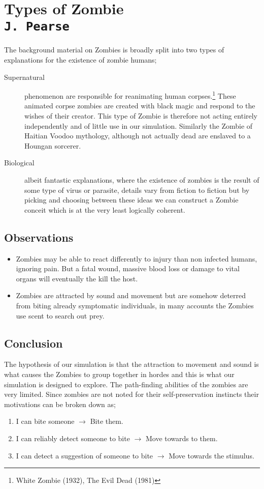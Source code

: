 \pagestyle{empty}

\section{Types of Zombie\\{\small\tt{J.~Pearse}}}
The background material on Zombies is broadly split into two types of explanations for the existence of zombie humans;
\begin{description}
\item[Supernatural] phenomenon are responsible for reanimating human corpses.\footnote{White Zombie (1932), The Evil Dead (1981)} These animated corpse zombies are created with black magic and respond to the wishes of their creator. This type of Zombie is therefore not acting entirely independently and of little use in our simulation. Similarly the Zombie of Haitian Voodoo mythology, although not actually dead are enslaved to a Houngan sorcerer.
\item[Biological] albeit fantastic explanations, where the existence of zombies is the result of some type of virus or parasite, details vary from fiction to fiction but by picking and choosing between these ideas we can construct a Zombie conceit which is at the very least logically coherent.
\end{description}
\subsection{Observations}
\begin{itemize}
\item Zombies may be able to react differently to injury than non infected humans, ignoring pain. But a fatal wound, massive blood loss or damage to vital organs will eventually the kill the host.
\item
Zombies are attracted by sound and movement but are somehow deterred from biting already symptomatic individuals, in many accounts the Zombies use scent to search out prey.
\end{itemize}

\subsection{Conclusion}
The hypothesis of our simulation is that the attraction to movement and sound is what causes the Zombies to group together in hordes and this is what our simulation is designed to explore. The path-finding abilities of the zombies are very limited.
Since zombies are not noted for their self-preservation instincts their motivations can be broken down as;
\begin{enumerate}
\item I can bite someone $\rightarrow$ Bite them.
\item I can reliably detect someone to bite $\rightarrow$ Move towards to them.
\item I can detect a suggestion of someone to bite $\rightarrow$ Move towards the stimulus.
\end{enumerate}
\clearpage
\endinput
